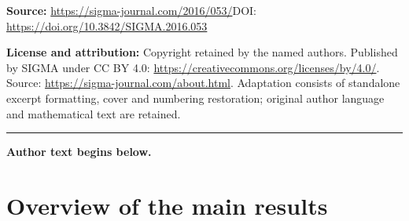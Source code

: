 \documentclass[11pt]{article}
\numberwithin{equation}{section}
\begin{document}
\noindent\textbf{Source:} \url{https://sigma-journal.com/2016/053/}\quad DOI: \url{https://doi.org/10.3842/SIGMA.2016.053}\par
\noindent\textbf{License and attribution:} Copyright retained by the named authors. Published by SIGMA under CC BY 4.0: \url{https://creativecommons.org/licenses/by/4.0/}. Source: \url{https://sigma-journal.com/about.html}. Adaptation consists of standalone excerpt formatting, cover and numbering restoration; original author language and mathematical text are retained.\par
\medskip\hrule\medskip\noindent\textbf{Author text begins below.}\par
\setcounter{section}{1}
\setcounter{subsection}{0}
\setcounter{subsubsection}{0}
\setcounter{Theorem}{0}
\setcounter{equation}{0}
\section{Overview of the main results}\label{sec.overview}
\end{document}

